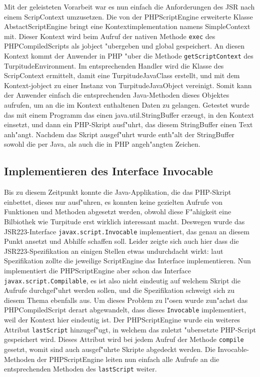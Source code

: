 Mit der geleisteten Vorarbeit war es nun einfach die Anforderungen des JSR nach einem ScripContext umzusetzen. Die von der PHPScriptEngine erweiterte Klasse
AbstactScriptEngine bringt eine Kontextimplementation namens SimpleContext mit. Dieser Kontext wird beim Aufruf der nativen Methode \texttt{exec} des PHPCompiledScripts
als jobject "ubergeben und global gespeichert. An diesen Kontext kommt der Anwender in PHP "uber die Methode \texttt{getScriptContext} des TurpitudeEnvironment. Im 
entsprechenden Handler wird die Klasse des ScripContext ermittelt, damit eine TurpitudeJavaClass erstellt, und mit dem Kontext-jobject zu einer Instanz von
TurpitudeJavaObject vereinigt. Somit kann der Anwender einfach die entsprechenden Java-Methoden dieses Objektes aufrufen, um an die im Kontext enthaltenen Daten zu
gelangen. Getestet wurde das mit einem Programm das einen java.util.StringBuffer erzeugt, in den Kontext einsetzt, und dann ein PHP-Skript ausf"uhrt, das diesem
StringBuffer einen Text anh"angt. Nachdem das Skript ausgef"uhrt wurde enth"alt der StringBuffer sowohl die per Java, als auch die in PHP angeh"angten Zeichen.

\subsection{Implementieren des Interface Invocable}
\label{sec:chap1:impl:10}

Bis zu diesem Zeitpunkt konnte die Java-Applikation, die das PHP-Skript einbettet, dieses nur ausf"uhren, es konnten keine gezielten Aufrufe von Funktionen und Methoden
abgesetzt werden, obwohl diese F"ahigkeit eine Bilbiothek wie Turpitude erst wirklich interessant macht. Deswegen wurde das JSR223-Interface \texttt{javax.script.Invocable}
implementiert, das genau an diesem Punkt ansetzt und Abhilfe schaffen soll. Leider zeigte sich auch hier dass die JSR223-Spezifikation an einigen Stellen
etwas undurchdacht wirkt: laut Spezifikation zollte die jeweilige ScriptEngine das Interface implementieren. Nun implementiert die PHPScriptEngine aber schon
das Interface \texttt{javax.script.Compilable}, es ist also nicht eindeutig auf welchem Skript die Aufrufe durchgef"uhrt werden sollen, und die Spezifikation schweigt
sich zu diesem Thema ebenfalls aus. Um dieses Problem zu l"osen wurde zun"achst das PHPCompiledScript derart abgewandelt, dass dieses \texttt{Invocable} implementiert,
weil der Kontext hier eindeutig ist. Der PHPScriptEngine wurde ein weiteres Attribut \texttt{lastScript} hinzugef"ugt, in welchem das zuletzt "ubersetzte 
PHP-Script gespeichert wird. Dieses Attribut wird bei jedem Aufruf der Methode \texttt{compile} gesetzt, womit sind auch ausgef"uhrte Skripte abgedeckt werden.
Die Invocable-Methoden der PHPScriptEngine leiten nun einfach alle Aufrufe an die entsprechenden Methoden des \texttt{lastScript} weiter.

